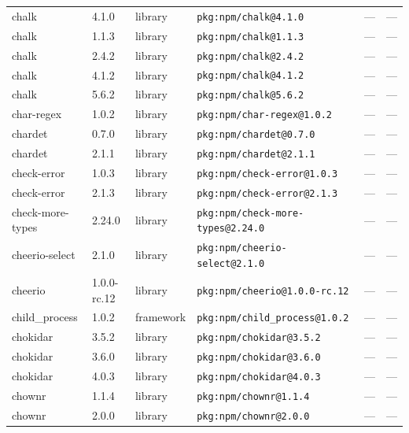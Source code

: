 \documentclass[11pt,a4paper]{article}
\begin{document}
\begin{longtable}{|p{4cm}|p{2cm}|p{1.6cm}|p{5cm}|p{1.5cm}|p{3.5cm}|}
\raggedright chalk & 4.1.0 & library & \small\texttt{pkg:npm/chalk@4.1.0} & — & \small — \\
\raggedright chalk & 1.1.3 & library & \small\texttt{pkg:npm/chalk@1.1.3} & — & \small — \\
\raggedright chalk & 2.4.2 & library & \small\texttt{pkg:npm/chalk@2.4.2} & — & \small — \\
\raggedright chalk & 4.1.2 & library & \small\texttt{pkg:npm/chalk@4.1.2} & — & \small — \\
\raggedright chalk & 5.6.2 & library & \small\texttt{pkg:npm/chalk@5.6.2} & — & \small — \\
\raggedright char-regex & 1.0.2 & library & \small\texttt{pkg:npm/char-regex@1.0.2} & — & \small — \\
\raggedright chardet & 0.7.0 & library & \small\texttt{pkg:npm/chardet@0.7.0} & — & \small — \\
\raggedright chardet & 2.1.1 & library & \small\texttt{pkg:npm/chardet@2.1.1} & — & \small — \\
\raggedright check-error & 1.0.3 & library & \small\texttt{pkg:npm/check-error@1.0.3} & — & \small — \\
\raggedright check-error & 2.1.3 & library & \small\texttt{pkg:npm/check-error@2.1.3} & — & \small — \\
\raggedright check-more-types & 2.24.0 & library & \small\texttt{pkg:npm/check-more-types@2.24.0} & — & \small — \\
\raggedright cheerio-select & 2.1.0 & library & \small\texttt{pkg:npm/cheerio-select@2.1.0} & — & \small — \\
\raggedright cheerio & 1.0.0-rc.12 & library & \small\texttt{pkg:npm/cheerio@1.0.0-rc.12} & — & \small — \\
\raggedright child\_process & 1.0.2 & framework & \small\texttt{pkg:npm/child\_process@1.0.2} & — & \small — \\
\raggedright chokidar & 3.5.2 & library & \small\texttt{pkg:npm/chokidar@3.5.2} & — & \small — \\
\raggedright chokidar & 3.6.0 & library & \small\texttt{pkg:npm/chokidar@3.6.0} & — & \small — \\
\raggedright chokidar & 4.0.3 & library & \small\texttt{pkg:npm/chokidar@4.0.3} & — & \small — \\
\raggedright chownr & 1.1.4 & library & \small\texttt{pkg:npm/chownr@1.1.4} & — & \small — \\
\raggedright chownr & 2.0.0 & library & \small\texttt{pkg:npm/chownr@2.0.0} & — & \small — \\

\end{longtable}
\end{document}
